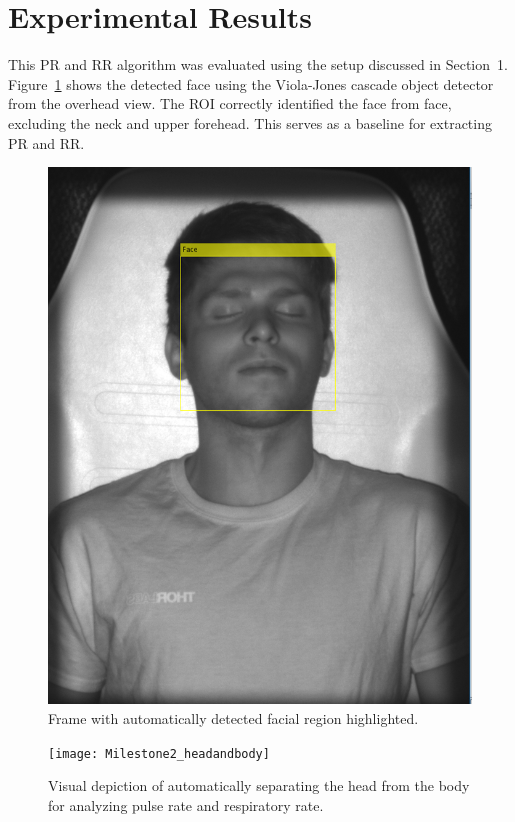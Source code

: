 \documentclass{article}
\begin{document}
\section{Experimental Results}
This PR and RR algorithm was evaluated using the setup discussed in Section~1. Figure~\ref{fig:face} shows the detected face using the Viola-Jones cascade object detector from the overhead view. The ROI correctly identified the face from face, excluding the neck and upper forehead. This serves as a baseline for extracting PR and RR.

\begin{figure}
\centering
\includegraphics[width=\textwidth]{Milestone2_FaceDetect}
\caption{Frame with automatically detected facial region highlighted.}
\label{fig:face}
\end{figure}

\begin{figure}
\centering
\texttt{[image: Milestone2\_headandbody]}
\caption{Visual depiction of automatically separating the head from the body for analyzing pulse rate and respiratory rate.}
\label{fig:headandbody}
\end{figure}
\end{document}
